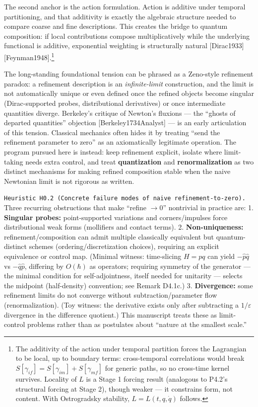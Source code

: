 \documentclass[
]{article}
\begin{document}
The second anchor is the action formulation. Action is additive under
temporal partitioning, and that additivity is exactly the algebraic
structure needed to compare coarse and fine descriptions. This creates
the bridge to quantum composition: if local contributions compose
multiplicatively while the underlying functional is additive,
exponential weighting is structurally natural {[}Dirac1933{]}
{[}Feynman1948{]}.\footnote{The additivity of the action under temporal
  partition forces the Lagrangian to be local, up to boundary terms:
  cross-temporal correlations would break
  \(S[\gamma_{if}]=S[\gamma_{im}]+S[\gamma_{mf}]\) for generic paths, so
  no cross-time kernel survives. Locality of \(L\) is a Stage 1 forcing
  result (analogous to P4.2's structural forcing at Stage 2), though
  weaker --- it constrains form, not content. With Ostrogradsky
  stability, \(L=L(t,q,\dot{q})\) follows.}

The long-standing foundational tension can be phrased as a Zeno-style
refinement paradox: a refinement description is an \emph{infinite-limit}
construction, and the limit is not automatically unique or even defined
once the refined objects become singular (Dirac-supported probes,
distributional derivatives) or once intermediate quantities diverge.
Berkeley's critique of Newton's fluxions --- the ``ghosts of departed
quantities'' objection {[}Berkeley1734Analyst{]} --- is an early
articulation of this tension. Classical mechanics often hides it by
treating ``send the refinement parameter to zero'' as an axiomatically
legitimate operation. The program pursued here is instead: keep
refinement explicit, isolate where limit-taking needs extra control, and
treat \textbf{quantization} and \textbf{renormalization} as two distinct
mechanisms for making refined composition stable when the naive
Newtonian limit is not rigorous as written.

\texttt{Heuristic\ H0.2\ (Concrete\ failure\ modes\ of\ naive\ refinement-to-zero).}
Three recurring obstructions that make ``refine \(\to 0\)'' nontrivial
in practice are: 1. \textbf{Singular probes:} point-supported variations
and corners/impulses force distributional weak forms (mollifiers and
contact terms). 2. \textbf{Non-uniqueness:} refinement/composition can
admit multiple classically equivalent but quantum-distinct schemes
(ordering/discretization choices), requiring an explicit equivalence or
control map. (Minimal witness: time-slicing \(H=pq\) can yield
\(-\hat p\hat q\) vs \(-\hat q\hat p\), differing by \(O(\hbar)\) as
operators; requiring symmetry of the generator --- the minimal condition
for self-adjointness, itself needed for unitarity --- selects the
midpoint (half-density) convention; see Remark D4.1c.) 3.
\textbf{Divergence:} some refinement limits do not converge without
subtraction/parameter flow (renormalization). (Toy witness: the
derivative exists only after subtracting a \(1/\varepsilon\) divergence
in the difference quotient.) This manuscript treats these as
limit-control problems rather than as postulates about ``nature at the
smallest scale.''
\end{document}
